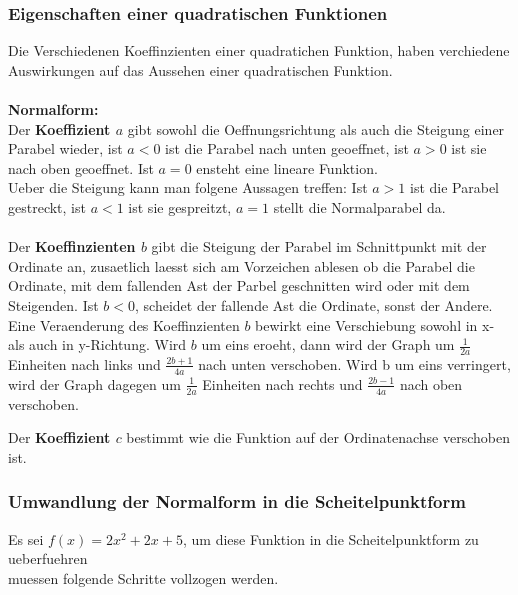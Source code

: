 \documentclass[a4paper]{article} %
\begin{document}
	\subsubsection{Eigenschaften einer quadratischen Funktionen}
	Die Verschiedenen Koeffinzienten einer quadratichen Funktion, haben verchiedene Auswirkungen auf das Aussehen einer
	quadratischen Funktion.\\
	\\ \textbf{Normalform:}\\
	Der \textbf{Koeffizient $a$} gibt sowohl die Oeffnungsrichtung als auch die Steigung einer Parabel wieder, ist $a < 0$ ist die Parabel nach unten geoeffnet, ist $a > 0$ ist sie nach oben geoeffnet. Ist $a = 0$ ensteht eine lineare Funktion.\texttt{}\\
	Ueber die Steigung kann man folgene Aussagen treffen: Ist $a > 1$ ist die Parabel gestreckt, ist $a<1$ ist sie gespreitzt, $a=1$ stellt die Normalparabel da.
	\\\\Der \textbf{Koeffinzienten $b$} gibt die Steigung der Parabel im Schnittpunkt mit der Ordinate an, zusaetlich laesst sich am Vorzeichen ablesen
	ob die Parabel die Ordinate, mit dem fallenden Ast der Parbel geschnitten wird oder mit dem Steigenden.
	Ist $b < 0$, scheidet der fallende Ast die Ordinate, sonst der Andere.
	Eine Veraenderung des Koeffinzienten $b$ bewirkt eine Verschiebung sowohl in x- als auch in y-Richtung. Wird $b$ um eins eroeht, dann wird der Graph um $\frac{1}{2a}$ Einheiten nach links und $\frac{2b+1}{4a}$ nach unten verschoben. Wird b um eins verringert, wird der Graph dagegen um $\frac{1}{2a}$ Einheiten nach rechts und $\frac{2b-1}{4a}$ nach oben verschoben.



	\hspace{-1.5 cm}
	Der \textbf{Koeffizient $c$} bestimmt wie die Funktion auf der Ordinatenachse verschoben ist.


	\subsubsection{Umwandlung der Normalform in die Scheitelpunktform}

		Es sei $f(x)=2x^2+2x+5$, um diese Funktion in die Scheitelpunktform zu ueberfuehren\\ muessen folgende Schritte vollzogen werden.
\end{document}
